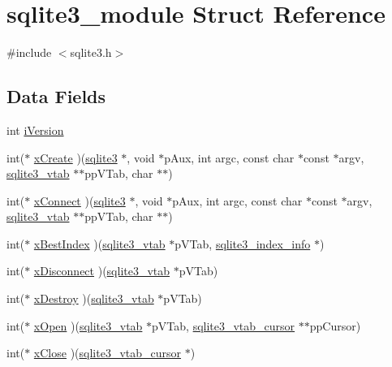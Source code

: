 \hypertarget{structsqlite3__module}{}\section{sqlite3\+\_\+module Struct Reference}
\label{structsqlite3__module}


{\ttfamily \#include $<$sqlite3.\+h$>$}

\subsection*{Data Fields}
\begin{DoxyCompactItemize}
\item 
int \hyperlink{structsqlite3__module_a1138620d71393e6105389670719d9685}{i\+Version}
\item 
int($\ast$ \hyperlink{structsqlite3__module_a93a4064c04057781ac266ed5974ceb81}{x\+Create} )(\hyperlink{structsqlite3}{sqlite3} $\ast$, void $\ast$p\+Aux, int argc, const char $\ast$const $\ast$argv, \hyperlink{structsqlite3__vtab}{sqlite3\+\_\+vtab} $\ast$$\ast$pp\+V\+Tab, char $\ast$$\ast$)
\item 
int($\ast$ \hyperlink{structsqlite3__module_a19f7accc13ac8ca9bdf5d3924b7eaf2b}{x\+Connect} )(\hyperlink{structsqlite3}{sqlite3} $\ast$, void $\ast$p\+Aux, int argc, const char $\ast$const $\ast$argv, \hyperlink{structsqlite3__vtab}{sqlite3\+\_\+vtab} $\ast$$\ast$pp\+V\+Tab, char $\ast$$\ast$)
\item 
int($\ast$ \hyperlink{structsqlite3__module_af634165424ffccb1ef5dab5ff650eb99}{x\+Best\+Index} )(\hyperlink{structsqlite3__vtab}{sqlite3\+\_\+vtab} $\ast$p\+V\+Tab, \hyperlink{structsqlite3__index__info}{sqlite3\+\_\+index\+\_\+info} $\ast$)
\item 
int($\ast$ \hyperlink{structsqlite3__module_a75840c001112dc870e9e9db39c0d4ed0}{x\+Disconnect} )(\hyperlink{structsqlite3__vtab}{sqlite3\+\_\+vtab} $\ast$p\+V\+Tab)
\item 
int($\ast$ \hyperlink{structsqlite3__module_af1b772670043b91e5e45a1a6becf9a41}{x\+Destroy} )(\hyperlink{structsqlite3__vtab}{sqlite3\+\_\+vtab} $\ast$p\+V\+Tab)
\item 
int($\ast$ \hyperlink{structsqlite3__module_a251c7aaab19d614717895337570c4ab1}{x\+Open} )(\hyperlink{structsqlite3__vtab}{sqlite3\+\_\+vtab} $\ast$p\+V\+Tab, \hyperlink{structsqlite3__vtab__cursor}{sqlite3\+\_\+vtab\+\_\+cursor} $\ast$$\ast$pp\+Cursor)
\item 
int($\ast$ \hyperlink{structsqlite3__module_a23c31c84107f2703d3d5103f14c76ed8}{x\+Close} )(\hyperlink{structsqlite3__vtab__cursor}{sqlite3\+\_\+vtab\+\_\+cursor} $\ast$)
$$
\end{DoxyCompactItemize}
